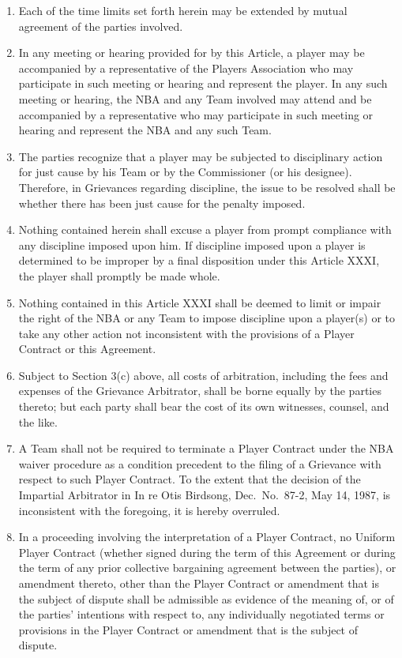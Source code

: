 \documentclass[
]{book}
\providecommand{\tightlist}{%
  \setlength{\itemsep}{0pt}\setlength{\parskip}{0pt}}
\begin{document}
\begin{enumerate}
\def\labelenumi{(\alph{enumi})}
\tightlist
\item
  Each of the time limits set forth herein may be extended by mutual agreement of the parties involved.
\item
  In any meeting or hearing provided for by this Article, a player may be accompanied by a representative of the Players Association who may participate in such meeting or hearing and represent the player. In any such meeting or hearing, the NBA and any Team involved may attend and be accompanied by a representative who may participate in such meeting or hearing and represent the NBA and any such Team.
\item
  The parties recognize that a player may be subjected to disciplinary action for just cause by his Team or by the Commissioner (or his designee). Therefore, in Grievances regarding discipline, the issue to be resolved shall be whether there has been just cause for the penalty imposed.
\item
  Nothing contained herein shall excuse a player from prompt compliance with any discipline imposed upon him. If discipline imposed upon a player is determined to be improper by a final disposition under this Article XXXI, the player shall promptly be made whole.
\item
  Nothing contained in this Article XXXI shall be deemed to limit or impair the right of the NBA or any Team to impose discipline upon a player(s) or to take any other action not inconsistent with the provisions of a Player Contract or this Agreement.
\item
  Subject to Section 3(c) above, all costs of arbitration, including the fees and expenses of the Grievance Arbitrator, shall be borne equally by the parties thereto; but each party shall bear the cost of its own witnesses, counsel, and the like.
\item
  A Team shall not be required to terminate a Player Contract under the NBA waiver procedure as a condition precedent to the filing of a Grievance with respect to such Player Contract. To the extent that the decision of the Impartial Arbitrator in In re Otis Birdsong, Dec.~No.~87-2, May 14, 1987, is inconsistent with the foregoing, it is hereby
  overruled.
\item
  In a proceeding involving the interpretation of a Player Contract, no Uniform Player Contract (whether signed during the term of this Agreement or during the term of any prior collective bargaining agreement between the parties), or amendment thereto, other than the Player Contract or amendment that is the subject of dispute shall be admissible as evidence of the meaning of, or of the parties' intentions with respect to, any individually negotiated terms or provisions in the Player Contract or amendment that is the subject of dispute.
\end{enumerate}
\end{document}
